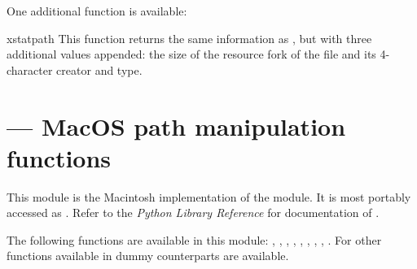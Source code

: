 One additional function is available:

\begin{funcdesc}{xstat}{path}
  This function returns the same information as , but
  with three additional values appended: the size of the resource fork
  of the file and its 4-character creator and type.
\end{funcdesc}


\section{ ---
         MacOS path manipulation functions}



This module is the Macintosh implementation of the 
module.  It is most portably accessed as
.  Refer to the \emph{Python Library
Reference} for documentation of .

The following functions are available in this module:
,
,
,
,
,
,
,
,
.
For other functions available in  dummy counterparts
are available.
